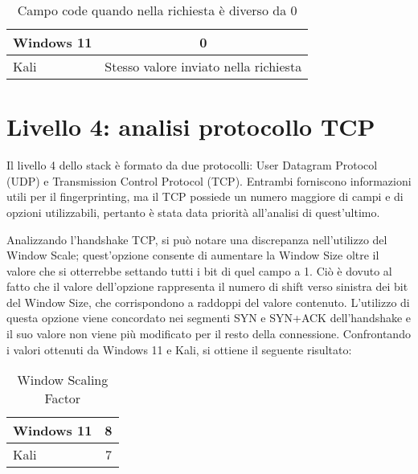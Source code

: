 \begin{table}[h]
	\centering
	\begin{tabular}{ | l | c |}
		\hline
		\rowcolor{blue!10} Windows 11 & 0
		\\
		\hline
		\rowcolor{red!10} Kali & Stesso valore inviato nella richiesta
		\\
		\hline

	\end{tabular}
	\caption{Campo code quando nella richiesta è diverso da 0}
	\label{tab:code}
\end{table}

\section{Livello 4: analisi protocollo TCP}
Il livello 4 dello stack è formato da due protocolli: User Datagram Protocol (UDP) e Transmission Control Protocol (TCP). Entrambi forniscono informazioni utili per il fingerprinting, ma il TCP possiede un numero maggiore di campi e di opzioni utilizzabili, pertanto è stata data priorità all'analisi di quest'ultimo.

Analizzando l'handshake TCP, si può notare una discrepanza nell'utilizzo del Window Scale; quest'opzione consente di aumentare la Window Size oltre il valore che si otterrebbe settando tutti i bit di quel campo a 1.
Ciò è dovuto al fatto che il valore dell'opzione rappresenta il numero di shift verso sinistra dei bit del Window Size, che corrispondono a raddoppi del valore contenuto. 
L'utilizzo di questa opzione viene concordato nei segmenti SYN e SYN+ACK dell'handshake e il suo valore non viene più modificato per il resto della connessione. Confrontando i valori ottenuti da Windows 11 e Kali, si ottiene il seguente risultato:
\\
\begin{table}[htb]
	\centering
	\begin{tabular}{| l | c |}
		\hline
		\rowcolor{blue!10} Windows 11 & 8
		\\
		\hline
		\rowcolor{red!10} Kali & 7
		\\
		\hline
		
	\end{tabular}
	\caption{Window Scaling Factor}
	\label{tab:Window Scale}
\end{table}

